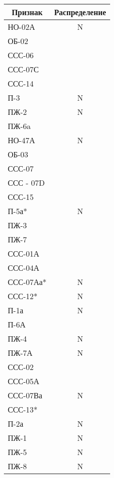 \begin{multicols}{2}
\begin{center}
{\small        \tabcolsep=18pt
        \begin{tabular}{|l|c|}
            \hline
        \multicolumn{1}{|c|}{Признак} &        \multicolumn{1}{c|}{ Распределение}\\
            \hline
            НО-02А & N \\ 
            ОБ-02 &    \\ 
            ССС-06 &   \\ 
            ССС-07С &  \\ 
            ССС-14 &   \\ 
            П-3 & N    \\ 
            ПЖ-2 & N   \\ 
            ПЖ-6a &    \\ 
             НО-47А & N\\  
             ОБ-03 &   \\  
             ССС-07   & \\ 
             ССС - 07D &\\ 
             ССС-15 & \\   
             П-5а* & N \\  
             ПЖ-3 & \\       
             ПЖ-7 & \\ 
              ССС-01А & \\  
              ССС-04А & \\  
              ССС-07Аа* &N\\ 
              ССС-12*& N\\  
              П-1а& N\\       
              П-6А& \\          
              ПЖ-4&N\\ 
              ПЖ-7А &N\\  
              ССС-02 &\\            
               ССС-05А & \\         
              ССС-07Ва & N\\     
               ССС-13* & \\         
               П-2а & N \\          
               ПЖ-1 & N\\           
               ПЖ-5 & N\\ 
               ПЖ-8 &N\\ 
               \hline              
        \end{tabular}}
\end{center} 


\end{multicols}
